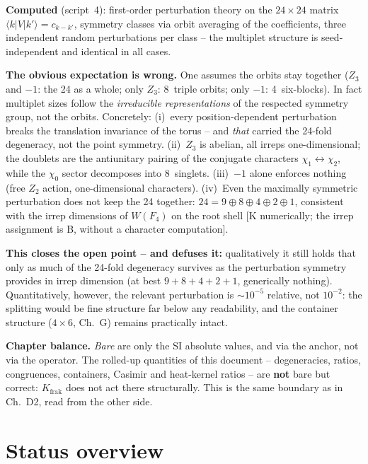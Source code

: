 \documentclass[11pt]{report}
\begin{document}
\textbf{Computed} (script~4): first-order perturbation theory on
the $24\times24$ matrix $\langle k|V|k'\rangle = c_{k-k'}$,
symmetry classes via orbit averaging of the coefficients, three
independent random perturbations per class -- the multiplet
structure is seed-independent and identical in all cases.

\textbf{The obvious expectation is wrong.} One assumes the orbits
stay together ($Z_3$ and $-1$: the 24 as a whole; only $Z_3$:
8~triple orbits; only $-1$: 4~six-blocks). In fact multiplet sizes
follow the \emph{irreducible representations} of the respected
symmetry group, not the orbits. Concretely: (i)~every position-dependent
perturbation breaks the translation invariance of the torus --
and \emph{that} carried the 24-fold degeneracy, not the point
symmetry. (ii)~$Z_3$ is abelian, all irreps one-dimensional; the
doublets are the antiunitary pairing of the conjugate characters
$\chi_1\leftrightarrow\chi_2$, while the $\chi_0$ sector
decomposes into 8~singlets. (iii)~$-1$ alone enforces nothing
(free $Z_2$ action, one-dimensional characters). (iv)~Even the
maximally symmetric perturbation does not keep the 24 together:
$24 = 9\oplus8\oplus4\oplus2\oplus1$, consistent with the
irrep dimensions of $W(F_4)$ on the root shell [K numerically;
the irrep assignment is B, without a character computation].

\textbf{This closes the open point -- and defuses it:}
qualitatively it still holds that only as much of the 24-fold
degeneracy survives as the perturbation symmetry provides in irrep
dimension (at best $9+8+4+2+1$, generically nothing).
Quantitatively, however, the relevant perturbation is
$\sim10^{-5}$ relative, not $10^{-2}$: the splitting would be fine
structure far below any readability, and the container structure
($4\times6$, Ch.~G) remains practically intact.

\textbf{Chapter balance.} \emph{Bare} are only the SI absolute
values, and via the anchor, not via the operator. The rolled-up
quantities of this document -- degeneracies, ratios, congruences,
containers, Casimir and heat-kernel ratios -- are \textbf{not}
bare but correct: $K_\text{frak}$ does not act there
structurally. This is the same boundary as in Ch.~D2, read from
the other side.

\chapter{Status overview}
\end{document}
